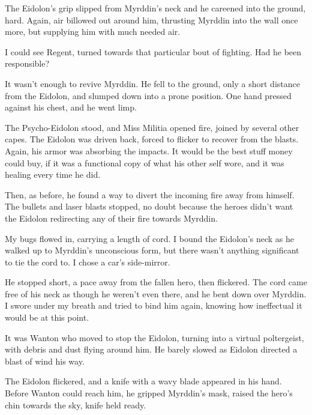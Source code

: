 The Eidolon's grip slipped from Myrddin's neck and he careened into the ground, hard.  Again, air billowed out around him, thrusting Myrddin into the wall once more, but supplying him with much needed air.



I could see Regent, turned towards that particular bout of fighting.  Had he been responsible?



It wasn't enough to revive Myrddin.  He fell to the ground, only a short distance from the Eidolon, and slumped down into a prone position.  One hand pressed against his chest, and he went limp.



The Psycho-Eidolon stood, and Miss Militia opened fire, joined by several other capes.  The Eidolon was driven back, forced to flicker to recover from the blasts.  Again, his armor was absorbing the impacts.  It would be the best stuff money could buy, if it was a functional copy of what his other self wore, and it was healing every time he did.



Then, as before, he found a way to divert the incoming fire away from himself.  The bullets and laser blasts stopped, no doubt because the heroes didn't want the Eidolon redirecting any of their fire towards Myrddin.



My bugs flowed in, carrying a length of cord.  I bound the Eidolon's neck as he walked up to Myrddin's unconscious form, but there wasn't anything significant to tie the cord to.  I chose a car's side-mirror.



He stopped short, a pace away from the fallen hero, then flickered.  The cord came free of his neck as though he weren't even there, and he bent down over Myrddin.  I swore under my breath and tried to bind him again, knowing how ineffectual it would be at this point.



It was Wanton who moved to stop the Eidolon, turning into a virtual poltergeist, with debris and dust flying around him.  He barely slowed as Eidolon directed a blast of wind his way.



The Eidolon flickered, and a knife with a wavy blade appeared in his hand.  Before Wanton could reach him, he gripped Myrddin's mask, raised the hero's chin towards the sky, knife held ready.



